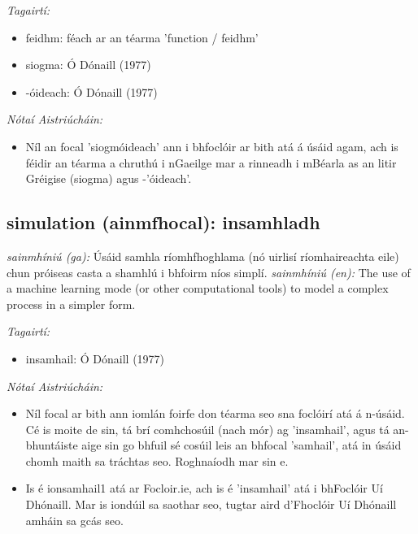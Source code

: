 \documentclass{article}
\begin{document}
 \noindent \textit{Tagairtí:}
\begin{itemize}
	\item feidhm: féach ar an téarma 'function / feidhm'
	\item siogma: Ó Dónaill (1977) \cite{odonaill}
	\item -óideach: Ó Dónaill (1977) \cite{odonaill}
\end{itemize}

 \noindent \textit{Nótaí Aistriúcháin:}
\begin{itemize}
	\item Níl an focal 'siogmóideach' ann i bhfoclóir ar bith atá á úsáid agam, ach is féidir an téarma a chruthú i nGaeilge mar a rinneadh i mBéarla as an litir Gréigise (siogma) agus -'óideach'.
\end{itemize}


\subsection*{simulation (ainmfhocal): insamhladh} 
 \noindent \textit{sainmhíniú (ga):} Úsáid samhla ríomhfhoghlama (nó uirlisí ríomhaireachta eile) chun próiseas casta a shamhlú i bhfoirm níos simplí.
\newline\newline
 \noindent \textit{sainmhíniú (en):} The use of a machine learning mode (or other computational tools) to model a complex process in a simpler form.
\newline

 \noindent \textit{Tagairtí:}
\begin{itemize}
	\item insamhail: Ó Dónaill (1977) \cite{odonaill}
\end{itemize}

 \noindent \textit{Nótaí Aistriúcháin:}
\begin{itemize}
	\item Níl focal ar bith ann iomlán foirfe don téarma seo sna foclóirí atá á n-úsáid. Cé is moite de sin, tá brí comhchosúil (nach mór) ag 'insamhail', agus tá an-bhuntáiste aige sin go bhfuil sé cosúil leis an bhfocal 'samhail', atá in úsáid chomh maith sa tráchtas seo. Roghnaíodh mar sin e.
	\item Is é ionsamhail1 atá ar Focloir.ie, ach is é 'insamhail' atá i bhFoclóir Uí Dhónaill. Mar is iondúil sa saothar seo, tugtar aird d'Fhoclóir Uí Dhónaill amháin sa gcás seo.
\end{itemize}
\end{document}

